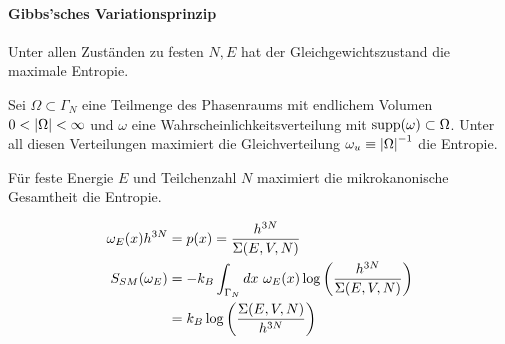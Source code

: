 \paragraph{Gibbs'sches Variationsprinzip}
Unter allen Zuständen zu festen $N,E$ hat der Gleichgewichtszustand die
maximale Entropie.

\begin{lemma}
    Sei $\Omega \subset \Gamma_N$ eine Teilmenge des Phasenraums mit
    endlichem Volumen $0<\left\vert \Omega \right\vert<\infty$ und $\omega$ eine Wahrscheinlichkeitsverteilung
    mit $\text{supp}(\omega) \subset \Omega$. Unter all diesen Verteilungen
    maximiert die Gleichverteilung $\omega_u \equiv \left\vert \Omega \right\vert^{-1}$ die
    Entropie.
\end{lemma}

\begin{theorem}
    Für feste Energie $E$ und Teilchenzahl $N$ maximiert die mikrokanonische
    Gesamtheit die Entropie.
\end{theorem}

\begin{bemerkung}
    \begin{align*}
        \omega_E (x) h^{3N} &= p(x) = \frac{h^{3N}}{\Sigma(E,V,N)}
        \\
        S_{SM}(\omega_E) &= - k_B \int_{\Gamma_N} dx \ \omega_E (x) \log \left( \frac{h^{3N}}{\Sigma (E,V,N)} \right)
        \\
        &= k_B \log \left( \frac{\Sigma(E,V,N)}{h^{3N}} \right)
    \end{align*}
\end{bemerkung}

